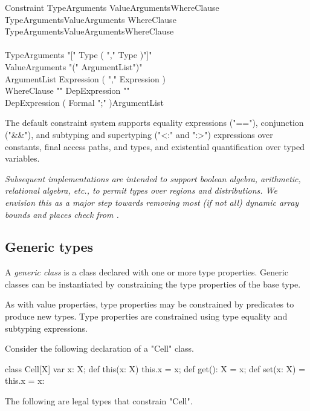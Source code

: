\begin{grammar}
Constraint \: TypeArguments     ValueArguments\opt WhereClause\opt \\
           \| TypeArguments\opt ValueArguments     WhereClause\opt \\
           \| TypeArguments\opt ValueArguments\opt WhereClause     \\
           \\
TypeArguments    \:  \xcd"[" Type ( \xcd"," Type )\star \xcd"]" \\
ValueArguments   \:  \xcd"(" ArgumentList\opt \xcd")" \\
ArgumentList     \:  Expression ( \xcd"," Expression )\star \\
WhereClause        \: \xcd"{" DepExpression \xcd"}" \\
DepExpression \: ( Formal \xcd";" )\star ArgumentList \\
\end{grammar}

The default \Xten{} constraint system supports equality expressions
(\xcd"=="), conjunction (\xcd"&&"), and subtyping and supertyping (\xcd"<:" and
\xcd":>") expressions over constants, final access paths, and
types, and existential quantification over typed variables.

\emph{
Subsequent implementations are intended to support boolean algebra,
arithmetic, relational algebra, etc., to permit types over regions and
distributions. We envision this as a major step towards removing most
(if not all) dynamic array bounds and places check from \Xten{}.
}


\subsection{Generic types}
\label{Generics}

        A {\em generic class} is a class
        declared with one or more type properties.  Generic
        classes can be instantiated by constraining the type
        properties of the base type.

As with value properties, type properties may be constrained
by predicates to produce new types.
Type properties are constrained using type equality and
subtyping expressions.

Consider the following declaration of a \xcd"Cell" class.
\begin{xten}
class Cell[X] {
    var x: X;
    def this(x: X) { this.x = x; }
    def get(): X = x;
    def set(x: X) = { this.x = x: }
}
\end{xten}
The following are legal types that constrain \xcd"Cell".

